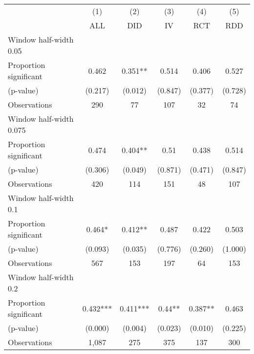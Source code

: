 
\def\sym#1{\ifmmode^{#1}\else\(^{#1}\)\fi}
\begin{tabular}{l*{5}{c}}
\hline\hline
& \multicolumn{1}{c}{(1)} &  \multicolumn{1}{c}{(2)} &  \multicolumn{1}{c}{(3)} &  \multicolumn{1}{c}{(4)} &  \multicolumn{1}{c}{(5)}\\
& \multicolumn{1}{c}{ALL} &  \multicolumn{1}{c}{DID} &  \multicolumn{1}{c}{IV} &  \multicolumn{1}{c}{RCT} &  \multicolumn{1}{c}{RDD}\\

\hline
\hline
Window half-width 0.05\\

Proportion significant& 0.462 &  0.351** &  0.514 &  0.406 &  0.527\\

(p-value) & (0.217) &  (0.012) &  (0.847) &  (0.377) &  (0.728)\\

Observations& 290 &  77 &  107 &  32 &  74\\

\hline
Window half-width 0.075\\

Proportion significant& 0.474 &  0.404** &  0.51 &  0.438 &  0.514\\

(p-value) & (0.306) &  (0.049) &  (0.871) &  (0.471) &  (0.847)\\

Observations& 420 &  114 &  151 &  48 &  107\\

\hline
Window half-width 0.1\\

Proportion significant& 0.464* &  0.412** &  0.487 &  0.422 &  0.503\\

(p-value) & (0.093) &  (0.035) &  (0.776) &  (0.260) &  (1.000)\\

Observations& 567 &  153 &  197 &  64 &  153\\

\hline
Window half-width 0.2\\

Proportion significant& 0.432*** &  0.411*** &  0.44** &  0.387** &  0.463\\

(p-value) & (0.000) &  (0.004) &  (0.023) &  (0.010) &  (0.225)\\

Observations& 1,087 &  275 &  375 &  137 &  300\\


\end{tabular}
